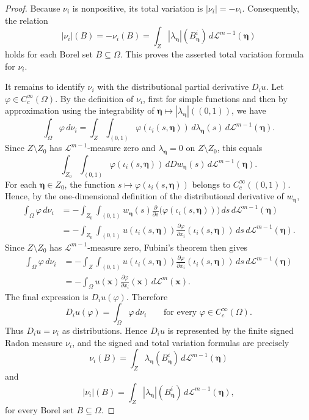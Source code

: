 \documentclass[10pt,a4paper]{amsart}
\begin{document}
\begin{proof}
Because \(\nu_i\) is nonpositive, its total variation is \(|\nu_i|=-\nu_i\).
Consequently,  
 the relation $$
|\nu_i|(B)
=
-\nu_i(B)
=
\int_Z
|\lambda_{\boldsymbol\eta}|(B_{\boldsymbol\eta}^{i})
\,d\mathcal L^{m-1}(\boldsymbol\eta) 
$$
 holds for each Borel set \(B\subseteq\Omega\). 
 This proves the asserted total variation formula for \(\nu_i\).

It remains to identify \(\nu_i\) with the distributional partial derivative
\(D_i u\). Let \(\varphi\in C_c^\infty(\Omega)\). By the definition of
\(\nu_i\), first for simple functions and then by approximation using the
integrability of
\(\boldsymbol\eta\mapsto |\lambda_{\boldsymbol\eta}|((0,1))\), we have
\[
\int_\Omega \varphi\,d\nu_i
=
\int_Z
\int_{(0,1)}
\varphi(\iota_i(s,\boldsymbol\eta))
\,d\lambda_{\boldsymbol\eta}(s)
\,d\mathcal L^{m-1}(\boldsymbol\eta).
\]
Since \(Z\setminus Z_0\) has \(\mathcal L^{m-1}\)-measure zero and
\(\lambda_{\boldsymbol\eta}=0\) on \(Z\setminus Z_0\), this equals
\[
\int_{Z_0}
\int_{(0,1)}
\varphi(\iota_i(s,\boldsymbol\eta))
\,dDw_{\boldsymbol\eta}(s)
\,d\mathcal L^{m-1}(\boldsymbol\eta).
\]
For each \(\boldsymbol\eta\in Z_0\), the function
$
s\mapsto \varphi(\iota_i(s,\boldsymbol\eta))
$ 
belongs to \(C_c^\infty((0,1))\). Hence, by the one-dimensional definition of
the distributional derivative of \(w_{\boldsymbol\eta}\),
\[
\begin{aligned}
\int_\Omega \varphi\,d\nu_i
&=
-\int_{Z_0}
\int_{(0,1)}
w_{\boldsymbol\eta}(s)
\frac{\partial}{\partial s}
\bigl(\varphi(\iota_i(s,\boldsymbol\eta))\bigr)
\,ds\,d\mathcal L^{m-1}(\boldsymbol\eta) \\[4pt]
&=
-\int_{Z_0}
\int_{(0,1)}
u(\iota_i(s,\boldsymbol\eta))
\frac{\partial\varphi}{\partial x_i}
(\iota_i(s,\boldsymbol\eta))
\,ds\,d\mathcal L^{m-1}(\boldsymbol\eta).
\end{aligned}
\]
Since \(Z\setminus Z_0\) has \(\mathcal L^{m-1}\)-measure zero, Fubini's theorem
then gives
\[
\begin{aligned}
\int_\Omega \varphi\,d\nu_i
&=
-\int_Z
\int_{(0,1)}
u(\iota_i(s,\boldsymbol\eta))
\frac{\partial\varphi}{\partial x_i}
(\iota_i(s,\boldsymbol\eta))
\,ds\,d\mathcal L^{m-1}(\boldsymbol\eta) \\[4pt]
&=
-\int_\Omega
u(\mathbf x)\frac{\partial\varphi}{\partial x_i}(\mathbf x)
\,d\mathcal L^m(\mathbf x).
\end{aligned}
\]
The final expression is \(D_i u(\varphi)\). Therefore
\[
D_i u(\varphi)=\int_\Omega \varphi\,d\nu_i
\qquad
\text{for every } \varphi\in C_c^\infty(\Omega).
\]
Thus \(D_i u=\nu_i\) as distributions. Hence \(D_i u\) is represented by the
finite signed Radon measure \(\nu_i\), and the signed and total variation
formulas are precisely
\[
\nu_i(B)
=
\int_Z
\lambda_{\boldsymbol\eta}(B_{\boldsymbol\eta}^{i})
\,d\mathcal L^{m-1}(\boldsymbol\eta)
\]
and
\[
|\nu_i|(B)
=
\int_Z
|\lambda_{\boldsymbol\eta}|(B_{\boldsymbol\eta}^{i})
\,d\mathcal L^{m-1}(\boldsymbol\eta),
\]
for every Borel set \(B\subseteq\Omega\).
\end{proof}
\end{document}
